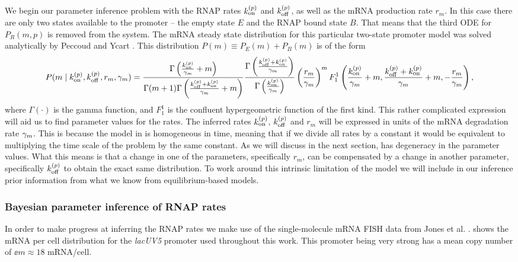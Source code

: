 We begin our parameter inference problem with the RNAP rates $k^{(p)}_{\text{on}}$ and
$k^{(p)}_{\text{off}}$, as well as the mRNA production rate $r_m$. In this case there are only
two states available to the promoter -- the empty state $E$ and the RNAP bound
state $B$. That means that the third ODE for $P_R(m, p)$ is removed from the
system. The mRNA steady state distribution for this particular two-state
promoter model was solved analytically by Peccoud and Ycart \cite{Peccoud1995}.
This distribution $P(m) \equiv P_E(m) + P_B(m)$ is of the form
\begin{equation}
  \small
  P(m \mid k^{(p)}_{\text{on}}, k^{(p)}_{\text{off}}, r_m, \gamma _m) =
  {\Gamma \left( \frac{k^{(p)}_{\text{on}}}{\gamma _m} + m \right) \over
  \Gamma(m + 1) \Gamma\left( \frac{k^{(p)}_{\text{off}}+k^{(p)}_{\text{on}}}{\gamma _m} + m \right)}
  {\Gamma\left( \frac{k^{(p)}_{\text{off}}+k^{(p)}_{\text{on}}}{\gamma _m} \right) \over
  \Gamma\left( \frac{k^{(p)}_{\text{on}}}{\gamma _m} \right)}
  \left( {r_m \over \gamma _m} \right)^m
  F_1^1 \left( {k^{(p)}_{\text{on}} \over \gamma _m} + m,
  {k^{(p)}_{\text{off}} + k^{(p)}_{\text{on}} \over \gamma _m} + m,
  -{r_m \over \gamma _m} \right),
  \label{seq_two_state_mRNA}
\end{equation}
where $\Gamma(\cdot)$ is the gamma function, and $F_1^1$ is the confluent
hypergeometric function of the first kind. This rather complicated expression
will aid us to find parameter values for the rates. The inferred rates $k^{(p)}_{\text{on}}$,
$k^{(p)}_{\text{off}}$ and $r_m$ will be expressed in units of the mRNA degradation rate
$\gamma _m$. This is because the model in  is homogeneous in
time, meaning that if we divide all rates by a constant it would be equivalent
to multiplying the time scale of the problem by the same constant. As we will
discuss in the next section,  has degeneracy in the
parameter values. What this means is that a change in one of the parameters,
specifically $r_m$, can be compensated by a change in another parameter,
specifically $k^{(p)}_{\text{off}}$ to obtain the exact same distribution. To work around this
intrinsic limitation of the model we will include in our inference prior
information from what we know from equilibrium-based models.

\subsubsection*{Bayesian parameter inference of RNAP rates}

In order to make progress at inferring the RNAP rates we make use of the
single-molecule mRNA FISH data from Jones et al. \cite{Jones2014a}.
 shows the mRNA per cell distribution for the
\textit{lacUV5} promoter used throughout this work. This promoter being very
strong has a mean copy number of $\ee{m} \approx 18$ mRNA/cell.

